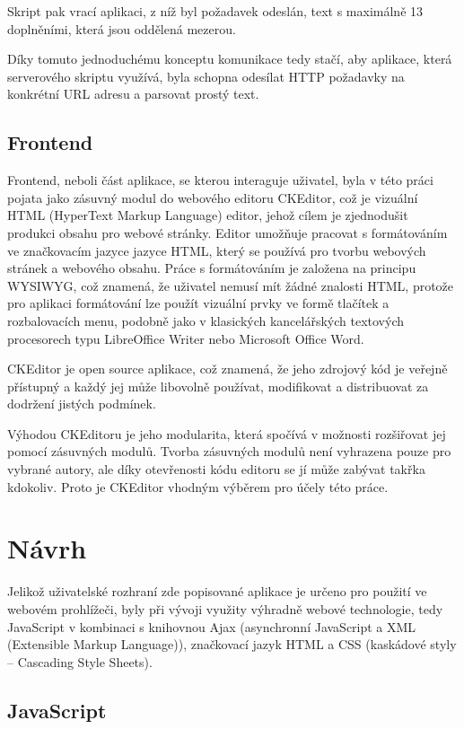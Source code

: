\documentclass[a4paper,11pt]{article}
\begin{document}
Skript pak vrací aplikaci, z níž byl požadavek odeslán, text s maximálně 13 doplněními, která jsou oddělená mezerou.

Díky tomuto jednoduchému konceptu komunikace tedy stačí, aby aplikace, která serverového skriptu využívá, byla schopna odesílat HTTP požadavky na konkrétní URL adresu a parsovat prostý text. 

\subsection{Frontend}

Frontend, neboli část aplikace, se kterou interaguje uživatel, byla v této práci pojata jako zásuvný modul do webového editoru CKEditor, což je vizuální HTML (HyperText Markup Language) editor, jehož cílem je zjednodušit produkci obsahu pro webové stránky. Editor umožňuje pracovat s formátováním ve značkovacím jazyce jazyce HTML, který se používá pro tvorbu webových stránek a webového obsahu. Práce s formátováním je založena na principu WYSIWYG, což znamená, že uživatel nemusí mít žádné znalosti HTML, protože pro aplikaci formátování lze použít vizuální prvky ve formě tlačítek a rozbalovacích menu, podobně jako v klasických kancelářských textových procesorech typu LibreOffice Writer nebo Microsoft Office Word.

CKEditor je open source aplikace, což znamená, že jeho zdrojový kód je veřejně přístupný a každý jej může libovolně používat, modifikovat a distribuovat za dodržení jistých podmínek. 

Výhodou CKEditoru je jeho modularita, která spočívá v možnosti rozšiřovat jej pomocí zásuvných modulů. Tvorba zásuvných modulů není vyhrazena pouze pro vybrané autory, ale  díky otevřenosti kódu editoru se jí může zabývat takřka kdokoliv. \parencite{cksource2015} Proto je CKEditor vhodným výběrem pro účely této práce. %

\section{Návrh}\label{navrh}

Jelikož uživatelské rozhraní zde popisované aplikace je určeno pro použití ve webovém prohlížeči, byly při vývoji využity výhradně webové technologie, tedy JavaScript v kombinaci s knihovnou Ajax (asynchronní JavaScript a XML (Extensible Markup Language)), značkovací jazyk HTML a CSS (kaskádové styly -- Cascading Style Sheets). 

\subsection{JavaScript}
\end{document}
